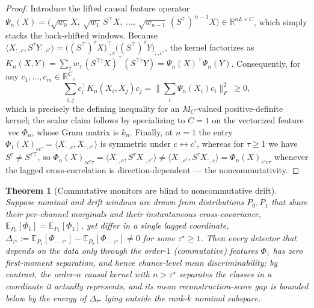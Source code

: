 \documentclass[
  aps,
  prresearch,
  reprint,
  amsmath,
  amssymb,
  nofootinbib,
  floatfix,
]{revtex4-2}
\newcommand{\Mc}{\ensuremath{M_C}}
\newtheorem{theorem}{Theorem}
\begin{document}
\begin{proof}
Introduce the lifted causal feature operator
$\Psi_n(X)=\big(\sqrt{w_0}\,X,\ \sqrt{w_1}\,S^{\top}X,\ \dots,\
\sqrt{w_{n-1}}\,(S^{\top})^{\,n-1}X\big)\in\mathbb{R}^{nL\times C}$, which simply
stacks the back-shifted windows. Because $\langle X_{:,c},S^{\tau}Y_{:,c'}\rangle
=\big((S^{\top})^{\tau}X\big)_{:,c}^{\top}\big((S^{\top})^{\tau}Y\big)_{:,c'}$, the
kernel factorizes as
$K_n(X,Y)=\sum_{\tau}w_\tau\,(S^{\top\tau}X)^{\top}(S^{\top\tau}Y)
=\Psi_n(X)^{\top}\Psi_n(Y)$. Consequently, for any $c_1,\dots,c_m\in\mathbb{R}^C$,
\[
  \sum_{i,j}c_i^{\top}K_n(X_i,X_j)c_j
  =\Big\|\sum_i \Psi_n(X_i)c_i\Big\|_F^2\ \ge 0,
\]
which is precisely the defining inequality for an $\Mc$-valued positive-definite
kernel; the scalar claim follows by specializing to $C{=}1$ on the vectorized
feature $\operatorname{vec}\Phi_n$, whose Gram matrix is $k_n$. Finally, at $n{=}1$
the entry $\Phi_1(X)_{cc'}=\langle X_{:,c},X_{:,c'}\rangle$ is symmetric under
$c\leftrightarrow c'$, whereas for $\tau\ge1$ we have $S^{\tau}\neq S^{\tau\top}$, so
$\Phi_n(X)_{cc'\tau}=\langle X_{:,c},S^{\tau}X_{:,c'}\rangle\neq
\langle X_{:,c'},S^{\tau}X_{:,c}\rangle=\Phi_n(X)_{c'c\tau}$ whenever the lagged
cross-correlation is direction-dependent --- the noncommutativity.
\end{proof}

\begin{theorem}[Commutative monitors are blind to noncommutative drift]
\label{thm:blind}
Suppose nominal and drift windows are drawn from distributions $P_0,P_1$ that share
their per-channel marginals and their instantaneous cross-covariance,
$\mathbb{E}_{P_0}[\Phi_1]=\mathbb{E}_{P_1}[\Phi_1]$, yet differ in a single lagged
coordinate, $\Delta_{\tau^\star}:=\mathbb{E}_{P_1}[\Phi_{\cdot\,\cdot\,\tau^\star}]
-\mathbb{E}_{P_0}[\Phi_{\cdot\,\cdot\,\tau^\star}]\neq0$ for some $\tau^\star\ge1$.
Then every detector that depends on the data only through the order-$1$
(commutative) features $\Phi_1$ has zero first-moment separation, and hence
chance-level mean discriminability; by contrast, the order-$n$ causal kernel with
$n>\tau^\star$ separates the classes in a coordinate it actually represents, and its
mean reconstruction-score gap is bounded below by the energy of
$\Delta_{\tau^\star}$ lying outside the rank-$k$ nominal subspace.
\end{theorem}
\end{document}
